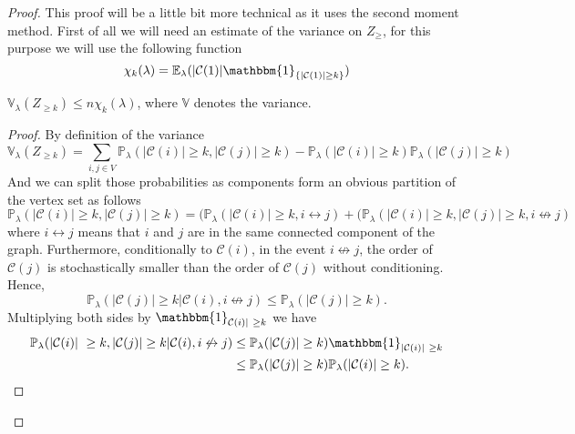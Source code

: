 \begin{proof}
	This proof will be a little bit more technical as it uses the second moment method.
	First of all we will need an estimate of the variance on $Z_{\geq}$, for this purpose we will use the following function
	\begin{equation}
		\chi_k(\lambda) = \mathbb{E}_{\lambda}(|\mathcal{C}(1)|\mathbbm{1}_{\{|\mathcal{C}(1)| \geq k\}})
	\end{equation}
	\begin{lemma}
		$\mathbb{V}_{\lambda}(Z_{\geq k}) \leq n\chi_k(\lambda)$, where $\mathbb{V}$ denotes the variance.
	\end{lemma}
	\begin{proof}
		By definition of the variance
		\begin{equation}
			\mathbb{V}_{\lambda}(Z_{\geq k}) = \sum_{i,j \in V}\mathbb{P}_{\lambda}(|\mathcal{C}(i)| \geq k, |\mathcal{C}(j)| \geq k)
				-\mathbb{P}_{\lambda}(|\mathcal{C}(i)| \geq k)\mathbb{P}_{\lambda}(|\mathcal{C}(j)| \geq k)
		\end{equation}
		And we can split those probabilities as components form an obvious partition of the vertex set as follows
		\begin{equation}
			\mathbb{P}_{\lambda}(|\mathcal{C}(i)| \geq k, |\mathcal{C}(j)| \geq k) 
			= (\mathbb{P}_{\lambda}(|\mathcal{C}(i)| \geq k, i \leftrightarrow j) 
			+ (\mathbb{P}_{\lambda}(|\mathcal{C}(i)| \geq k, |\mathcal{C}(j)| \geq k, i \not\leftrightarrow j)
		\end{equation}
		where $i\leftrightarrow j$ means that $i$ and $j$ are in the same connected component of the graph.
		Furthermore, conditionally to $\mathcal{C}(i)$, in the event $i \not\leftrightarrow j$, the order of $\mathcal{C}(j)$ is stochastically smaller than the order of $\mathcal{C}(j)$ without conditioning.
		Hence,
		\begin{equation}
			\mathbb{P}_{\lambda}(|\mathcal{C}(j)| \geq k | \mathcal{C}(i), i \not\leftrightarrow j) \leq \mathbb{P}_{\lambda}(|\mathcal{C}(j)| \geq k).
		\end{equation}
		Multiplying both sides by $\mathbbm{1}_{\mathcal{C}(i)| \geq k}$ we have
		\begin{align}
			\mathbb{P}_{\lambda}(|\mathcal{C}(i)| \geq k, |\mathcal{C}(j)| \geq k | \mathcal{C}(i), i \not\leftrightarrow j) 
			&\leq \mathbb{P}_{\lambda}(|\mathcal{C}(j)| \geq k)\mathbbm{1}_{|\mathcal{C}(i)| \geq k}\\
			&\leq \mathbb{P}_{\lambda}(|\mathcal{C}(j)| \geq k)\mathbb{P}_{\lambda}(|\mathcal{C}(i)| \geq k).

\end{align}
\end{proof}
\end{proof}
